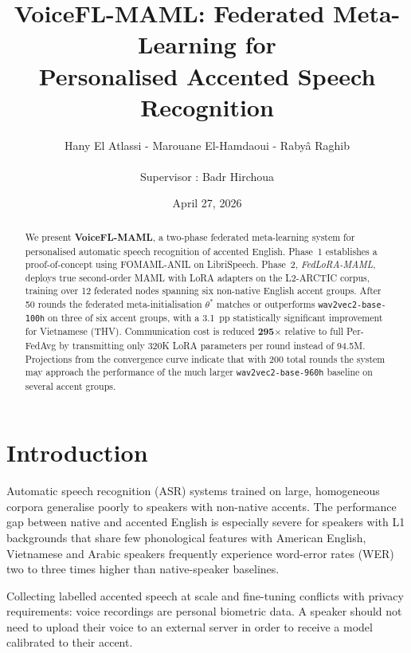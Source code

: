 \documentclass[12pt]{article}
\title{VoiceFL-MAML: Federated Meta-Learning for\\
       Personalised Accented Speech Recognition}
\author{Hany El Atlassi - Marouane El-Hamdaoui - Rabyâ Raghib \\ \\
Supervisor : Badr Hirchoua \\}
\date{April 27, 2026}
\theoremstyle{plain}
\begin{document}
\maketitle
\thispagestyle{empty}

\begin{abstract}
We present \textbf{VoiceFL-MAML}, a two-phase federated meta-learning system for personalised automatic speech recognition of accented English. Phase~1 establishes a proof-of-concept using FOMAML-ANIL on LibriSpeech. Phase~2, \emph{FedLoRA-MAML}, deploys true second-order MAML with LoRA adapters on the L2-ARCTIC corpus, training over 12 federated nodes spanning six non-native English accent groups.
After 50 rounds the federated meta-initialisation $\theta^*$ matches or outperforms \texttt{wav2vec2-base-100h} on three of six accent groups, with a \SI{3.1}{pp} statistically significant improvement for Vietnamese (THV). Communication cost is reduced \textbf{295$\times$} relative to full Per-FedAvg by transmitting only 320K LoRA parameters per round instead of 94.5M.
Projections from the convergence curve indicate that with 200 total rounds the system may approach the performance of the much larger \texttt{wav2vec2-base-960h} baseline
on several accent groups.
\end{abstract}


\tableofcontents
\clearpage


\section*{Introduction}

Automatic speech recognition (ASR) systems trained on large, homogeneous corpora
generalise poorly to speakers with non-native accents.
The performance gap between native and accented English is especially severe for
speakers with L1 backgrounds that share few phonological features with American
English, Vietnamese and Arabic speakers frequently experience word-error rates
(WER) two to three times higher than native-speaker baselines.

Collecting labelled accented speech at scale and
fine-tuning conflicts with privacy requirements: voice recordings are personal
biometric data.
A speaker should not need to upload their voice to an external server in order to
receive a model calibrated to their accent.
\end{document}
